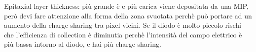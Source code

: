 Epitaxial layer thickness: più grande è e più carica viene depositata da una MIP, però devi fare attenzione alla forma della zona svuotata perchè può portare ad un aumento della charge sharing tra pixel vicini. Se il diodo è molto piccolo rischi che l'efficienza di collection è diminutia perchè l'intensità del campo elettrico è più bassa intorno al diodo, e hai più charge sharing.\\
